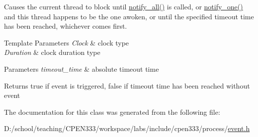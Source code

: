 Causes the current thread to block until {\ttfamily \hyperlink{classcpen333_1_1process_1_1event_a80184c9e2762fb1a0d7f3a9ff6ae27e7}{notify\+\_\+all()}} is called, or {\ttfamily \hyperlink{classcpen333_1_1process_1_1event_a47077325cc6cb29df3aba00de683ce42}{notify\+\_\+one()}} and this thread happens to be the one awoken, or until the specified timeout time has been reached, whichever comes first.


\begin{DoxyTemplParams}{Template Parameters}
{\em Clock} & clock type \\
\hline
{\em Duration} & clock duration type \\
\hline
\end{DoxyTemplParams}

\begin{DoxyParams}{Parameters}
{\em timeout\+\_\+time} & absolute timeout time \\
\hline
\end{DoxyParams}
\begin{DoxyReturn}{Returns}
{\ttfamily true} if event is triggered, {\ttfamily false} if timeout time has been reached without event 
\end{DoxyReturn}


The documentation for this class was generated from the following file\+:\begin{DoxyCompactItemize}
\item 
D\+:/school/teaching/\+C\+P\+E\+N333/workspace/labs/include/cpen333/process/\hyperlink{process_2event_8h}{event.\+h}\end{DoxyCompactItemize}
